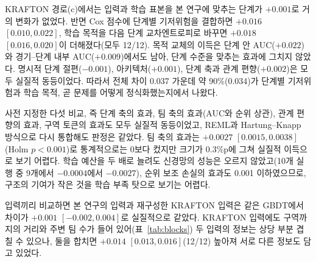 KRAFTON 경로(c)에서는 입력과 학습 표본을 본 연구에 맞추는 단계가 $+0.001$로 거의 변화가 없었다.
반면 Cox 점수에 단계별 기저위험을 결합하면 $+0.016$ $[0.010, 0.022]$, 학습 목적을 다음 단계 교차엔트로피로 바꾸면 $+0.018$ $[0.016, 0.020]$이 더해졌다(모두 12/12).
목적 교체의 이득은 단계 안 AUC($+0.022$)와 경기--단계 내부 AUC($+0.009$)에서도 남아, 단계 수준을 맞추는 효과에 그치지 않았다.
명시적 단계 절편($-0.001$), 아키텍처($+0.001$), 단계 축과 관계 편향($+0.002$)은 모두 실질적 동등이었다.
따라서 전체 차이 0.037 가운데 약 90\%(0.034)가 단계별 기저위험과 학습 목적, 곧 문제를 어떻게 정식화했는지에서 나왔다.

사전 지정한 다섯 비교, 즉 단계 축의 효과, 팀 축의 효과(AUC와 순위 상관), 관계 편향의 효과, 구역 토큰의 효과도 모두 실질적 동등이었고, REML과 Hartung--Knapp 방식으로 다시 통합해도 판정은 같았다.
팀 축의 효과는 $+0.0027$ $[0.0015, 0.0038]$(Holm $p<0.001$)로 통계적으로는 0보다 컸지만 크기가 0.3\%p에 그쳐 실질적 이득으로 보기 어렵다.
학습 예산을 두 배로 늘려도 신경망의 성능은 오르지 않았고(10개 실행 중 9개에서 $-0.0004$에서 $-0.0027$), 순위 보조 손실의 효과도 0.001 이하였으므로, 구조의 기여가 작은 것을 학습 부족 탓으로 보기는 어렵다.

입력끼리 비교하면 본 연구의 입력과 재구성한 KRAFTON 입력은 같은 GBDT에서 차이가 $+0.001$ $[-0.002, 0.004]$로 실질적으로 같았다.
KRAFTON 입력에도 구역까지의 거리와 주변 팀 수가 들어 있어(표~\ref{tab:blocks}) 두 입력의 정보는 상당 부분 겹칠 수 있으나, 둘을 합치면 $+0.014$ $[0.013, 0.016]$(12/12) 높아져 서로 다른 정보도 담고 있었다.
